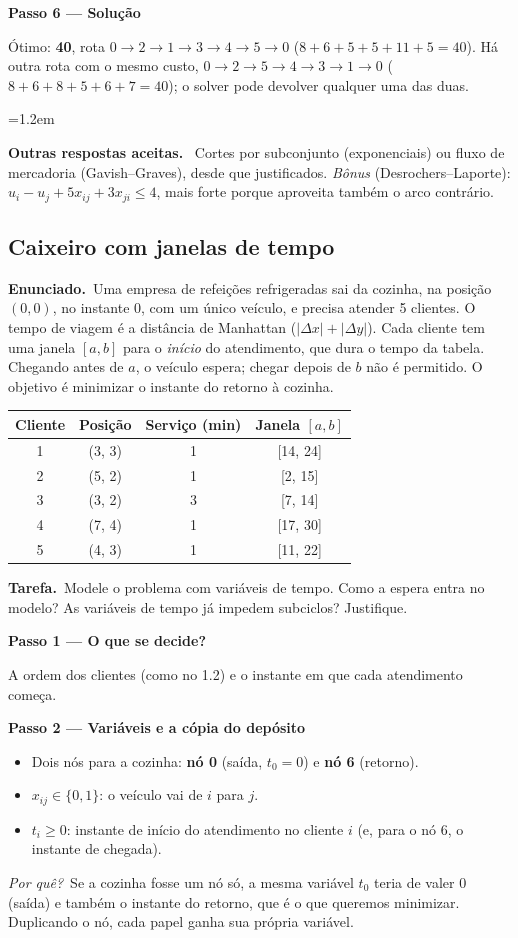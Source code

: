 \documentclass[11pt,a4paper]{article}
\newcommand{\enunciado}{\par\textbf{Enunciado.}\ }
\newcommand{\tarefa}{\par\textbf{Tarefa.}\ }
\newcommand{\passo}[1]{\par\medskip\textbf{#1}\par}
\newcommand{\porque}{\textit{Por quê?}\ }
\newenvironment{nota}[1]{\par\smallskip\begin{list}{}{\leftmargin=1.2em\rightmargin=0pt}\item[]\textbf{#1.}\ }{\end{list}}
\begin{document}
\passo{Passo 6 --- Solução}
Ótimo: \textbf{40}, rota $0\to2\to1\to3\to4\to5\to0$ ($8+6+5+5+11+5=40$). Há outra rota com o mesmo
custo, $0\to2\to5\to4\to3\to1\to0$ ($8+6+8+5+6+7=40$); o solver pode devolver qualquer uma das duas.

\begin{nota}{Outras respostas aceitas}
Cortes por subconjunto (exponenciais) ou fluxo de mercadoria (Gavish--Graves), desde que justificados.
\textit{Bônus} (Desrochers--Laporte): $u_i-u_j+5x_{ij}+3x_{ji}\le4$, mais forte porque aproveita também o
arco contrário.
\end{nota}

\subsection{Caixeiro com janelas de tempo}
\enunciado Uma empresa de refeições refrigeradas sai da cozinha, na posição $(0,0)$, no instante 0, com um
único veículo, e precisa atender 5 clientes. O tempo de viagem é a distância de Manhattan
($|\Delta x|+|\Delta y|$). Cada cliente tem uma janela $[a,b]$ para o \emph{início} do atendimento, que dura o
tempo da tabela. Chegando antes de $a$, o veículo espera; chegar depois de $b$ não é permitido. O objetivo é
minimizar o instante do retorno à cozinha.
\begin{center}
\begin{tabular}{cccc}
\toprule
Cliente & Posição & Serviço (min) & Janela $[a,b]$\\
\midrule
1 & (3, 3) & 1 & [14, 24]\\
2 & (5, 2) & 1 & [2, 15]\\
3 & (3, 2) & 3 & [7, 14]\\
4 & (7, 4) & 1 & [17, 30]\\
5 & (4, 3) & 1 & [11, 22]\\
\bottomrule
\end{tabular}
\end{center}
\tarefa Modele o problema com variáveis de tempo. Como a espera entra no modelo? As variáveis de tempo
já impedem subciclos? Justifique.

\passo{Passo 1 --- O que se decide?}
A ordem dos clientes (como no 1.2) e o instante em que cada atendimento começa.

\passo{Passo 2 --- Variáveis e a cópia do depósito}
\begin{itemize}
  \item Dois nós para a cozinha: \textbf{nó 0} (saída, $t_0=0$) e \textbf{nó 6} (retorno).
  \item $x_{ij}\in\{0,1\}$: o veículo vai de $i$ para $j$.
  \item $t_i\ge0$: instante de início do atendimento no cliente $i$ (e, para o nó 6, o instante de chegada).
\end{itemize}
\porque Se a cozinha fosse um nó só, a mesma variável $t_0$ teria de valer 0 (saída) e também o instante do
retorno, que é o que queremos minimizar. Duplicando o nó, cada papel ganha sua própria variável.
\end{document}

